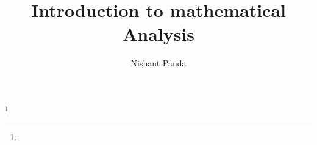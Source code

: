 \documentclass{amstext-l}
\begin{document}
\frontmatter


\title{Introduction to mathematical Analysis}

\author{Nishant Panda}
\address{2451 S. Timberline Rd, Apt 4, Fort Collins, Co 80525}
\curraddr{}
\thanks{}



\maketitle
\setcounter{page}{5}
\tableofcontents

\mainmatter{}







\appendix

\backmatter{}
\end{document}
